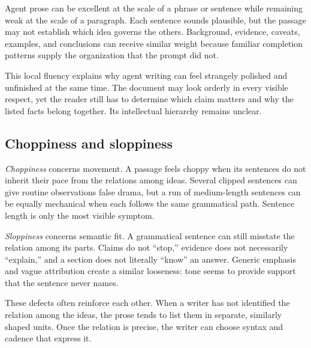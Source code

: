 Agent prose can be excellent at the scale of a phrase or sentence while
remaining weak at the scale of a paragraph. Each sentence sounds plausible,
but the passage may not establish which idea governs the others. Background,
evidence, caveats, examples, and conclusions can receive similar weight
because familiar completion patterns supply the organization that the prompt
did not.

This local fluency explains why agent writing can feel strangely polished and
unfinished at the same time. The document may look orderly in every visible
respect, yet the reader still has to determine which claim matters and why the
listed facts belong together. Its intellectual hierarchy remains unclear.

\subsection{Choppiness and sloppiness}

\emph{Choppiness} concerns movement. A passage feels choppy when its sentences
do not inherit their pace from the relations among ideas. Several clipped
sentences can give routine observations false drama, but a run of
medium-length sentences can be equally mechanical when each follows the same
grammatical path. Sentence length is only the most visible symptom.

\emph{Sloppiness} concerns semantic fit. A grammatical sentence can still
misstate the relation among its parts. Claims do not ``stop,'' evidence does
not necessarily ``explain,'' and a section does not literally ``know'' an
answer. Generic emphasis and vague attribution create a similar looseness:
tone seems to provide support that the sentence never names.

These defects often reinforce each other. When a writer has not identified the
relation among the ideas, the prose tends to list them in separate,
similarly shaped units. Once the relation is precise, the writer can choose
syntax and cadence that express it.
